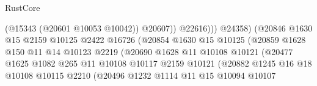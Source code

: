 \begin{lexlean}{RustCore}
\begin{coremodule}
                                                  (@15343 (@20601 @10053 @10042))
                                                  @20607))
                                              @22616)))
                                        @24358)
                                      (@20846
                                        @1630
                                        @15
                                        @2159
                                        @10125
                                        @2422
                                        @16726
                                        (@20854
                                          @1630
                                          @15
                                          @10125
                                          (@20859
                                            @1628
                                            @150
                                            @11
                                            @14
                                            @10123
                                            @2219
                                            (@20690
                                              @1628
                                              @11
                                              @10108
                                              @10121
                                              (@20477
                                                @1625
                                                @1082
                                                @265
                                                @11
                                                @10108
                                                @10117
                                                @2159
                                                @10121
                                                (@20882
                                                  @1245
                                                  @16
                                                  @18
                                                  @10108
                                                  @10115
                                                  @2210
                                                  (@20496
                                                    @1232
                                                    @1114
                                                    @11
                                                    @15
                                                    @10094
                                                    @10107

\end{coremodule}
\end{lexlean}
